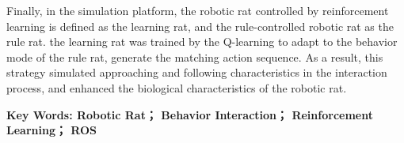 Finally, in the simulation platform, the robotic rat controlled by reinforcement learning is defined as the learning rat, and the rule-controlled robotic rat as the rule rat. the learning rat was trained by the Q-learning to adapt to the behavior mode of the rule rat, generate the matching action sequence. As a result, this strategy simulated approaching and following characteristics in the interaction process, and enhanced the biological characteristics of the robotic rat.

\vspace{3ex}\noindent\textbf{Key Words: Robotic Rat； Behavior Interaction； Reinforcement Learning； ROS}
\newpage
